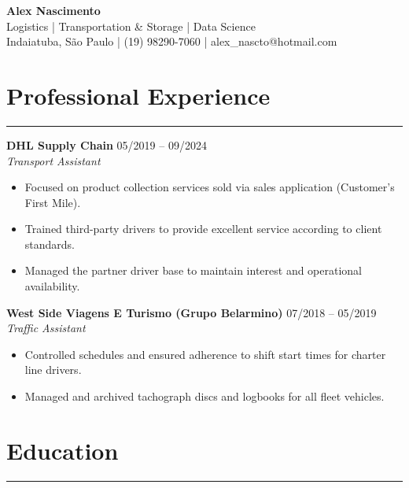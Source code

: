 \documentclass[11pt,a4paper]{article}
\begin{document}
\begin{center}
    {\Huge \textbf{Alex Nascimento}} \\
    \vspace{2mm}
            Logistics | Transportation & Storage | Data Science \\
        Indaiatuba, São Paulo | (19) 98290-7060 | alex_nascto@hotmail.com
\end{center}

\vspace{5mm}

\section*{Professional Experience}
\hrule
\vspace{3mm}

    \noindent \textbf{DHL Supply Chain} \hfill 05/2019 -- 09/2024 \\
    \textit{Transport Assistant}
    \begin{itemize}
                            \item Focused on product collection services sold via sales application (Customer's First Mile).
                    \item Trained third-party drivers to provide excellent service according to client standards.
                    \item Managed the partner driver base to maintain interest and operational availability.
            \end{itemize}
    \vspace{2mm}
    \noindent \textbf{West Side Viagens E Turismo (Grupo Belarmino)} \hfill 07/2018 -- 05/2019 \\
    \textit{Traffic Assistant}
    \begin{itemize}
                            \item Controlled schedules and ensured adherence to shift start times for charter line drivers.
                    \item Managed and archived tachograph discs and logbooks for all fleet vehicles.
            \end{itemize}
    \vspace{2mm}

\vspace{5mm}
\section*{Education}
\hrule
\vspace{3mm}
\end{document}
